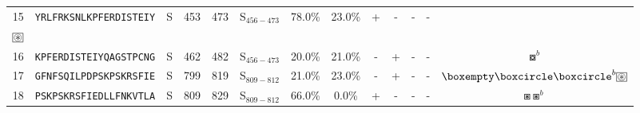 \begin{tabular}{rcccccccccccc}
15 &  \texttt{YRLFRKSNLKPFERDISTEIY} &       S &    453 &   473 &  S$_{456-473}$ &                          78.0\% &                           23.0\% &          + &           - &          - &           - &  \Centerstack{  $\boxempty \boxast \boxast^b \boxcircle$ \\  $\setlength{\fboxsep}{0.5pt} \boxed{\circledast}$ } \\
16 &  \texttt{KPFERDISTEIYQAGSTPCNG} &       S &    462 &   482 &  S$_{456-473}$ &                          20.0\% &                           21.0\% &          - &           + &          - &           - &                                                                                                 $ \boxcircle^b $ \\
17 &  \texttt{GFNFSQILPDPSKPSKRSFIE} &       S &    799 &   819 &  S$_{809-812}$ &                          21.0\% &                           23.0\% &          - &           + &          - &           - &                            $ \boxempty \boxcircle \boxcircle^b \setlength{\fboxsep}{0.5pt} \boxed{\circledast} $ \\
18 &  \texttt{PSKPSKRSFIEDLLFNKVTLA} &       S &    809 &   829 &  S$_{809-812}$ &                          66.0\% &                            0.0\% &          + &           - &          - &           - &                                                                                            $ \boxast \boxast^b $ \\
\bottomrule
\end{tabular}
